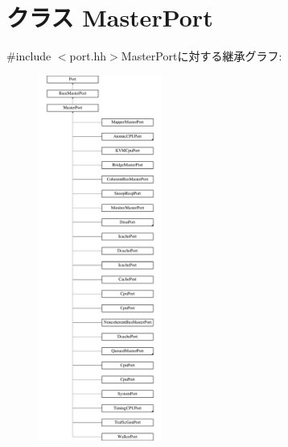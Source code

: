 \hypertarget{classMasterPort}{
\section{クラス MasterPort}
\label{classMasterPort}
}


{\ttfamily \#include $<$port.hh$>$}MasterPortに対する継承グラフ:\begin{figure}[H]
\begin{center}
\leavevmode
\includegraphics[height=12cm]{classMasterPort}
\end{center}
\end{figure}
